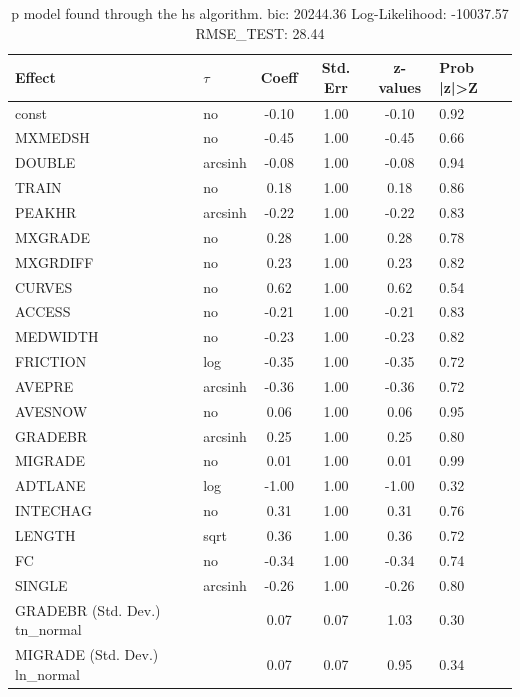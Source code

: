 \begin{table}
	\caption{p model found through the hs algorithm. bic: 20244.36 Log-Likelihood: -10037.57 RMSE_TEST: 28.44}
	\begin{center}
		\begin{tabular}{|l|l|c|c|c|l|}
			\hline
			Effect & $\tau$ & Coeff & Std. Err & z-values & Prob |z|>Z \\
			\hline
			const & no & -0.10 & 1.00 & -0.10 & 0.92 \\
			\hline
			MXMEDSH & no & -0.45 & 1.00 & -0.45 & 0.66 \\
			\hline
			DOUBLE & arcsinh & -0.08 & 1.00 & -0.08 & 0.94 \\
			\hline
			TRAIN & no & 0.18 & 1.00 & 0.18 & 0.86 \\
			\hline
			PEAKHR & arcsinh & -0.22 & 1.00 & -0.22 & 0.83 \\
			\hline
			MXGRADE & no & 0.28 & 1.00 & 0.28 & 0.78 \\
			\hline
			MXGRDIFF & no & 0.23 & 1.00 & 0.23 & 0.82 \\
			\hline
			CURVES & no & 0.62 & 1.00 & 0.62 & 0.54 \\
			\hline
			ACCESS & no & -0.21 & 1.00 & -0.21 & 0.83 \\
			\hline
			MEDWIDTH & no & -0.23 & 1.00 & -0.23 & 0.82 \\
			\hline
			FRICTION & log & -0.35 & 1.00 & -0.35 & 0.72 \\
			\hline
			AVEPRE & arcsinh & -0.36 & 1.00 & -0.36 & 0.72 \\
			\hline
			AVESNOW & no & 0.06 & 1.00 & 0.06 & 0.95 \\
			\hline
			GRADEBR & arcsinh & 0.25 & 1.00 & 0.25 & 0.80 \\
			\hline
			MIGRADE & no & 0.01 & 1.00 & 0.01 & 0.99 \\
			\hline
			ADTLANE & log & -1.00 & 1.00 & -1.00 & 0.32 \\
			\hline
			INTECHAG & no & 0.31 & 1.00 & 0.31 & 0.76 \\
			\hline
			LENGTH & sqrt & 0.36 & 1.00 & 0.36 & 0.72 \\
			\hline
			FC & no & -0.34 & 1.00 & -0.34 & 0.74 \\
			\hline
			SINGLE & arcsinh & -0.26 & 1.00 & -0.26 & 0.80 \\
			\hline
			GRADEBR (Std. Dev.) tn_normal &  & 0.07 & 0.07 & 1.03 & 0.30 \\
			\hline
			MIGRADE (Std. Dev.) ln_normal &  & 0.07 & 0.07 & 0.95 & 0.34 \\

\end{tabular}
\end{center}
\end{table}
